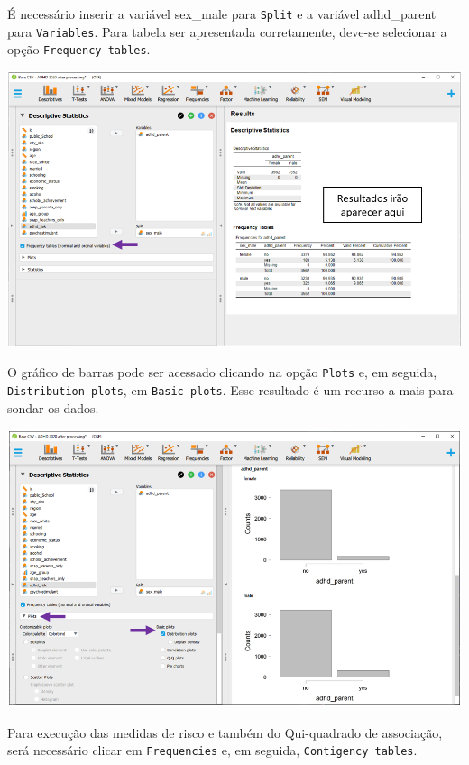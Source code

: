 \documentclass[
]{book}
\begin{document}
É necessário inserir a variável sex\_male para \texttt{Split} e a variável adhd\_parent para \texttt{Variables}. Para tabela ser apresentada corretamente, deve-se selecionar a opção \texttt{Frequency\ tables}.

\includegraphics{./img/cap_x2_descritivo.png}

O gráfico de barras pode ser acessado clicando na opção \texttt{Plots} e, em seguida, \texttt{Distribution\ plots}, em \texttt{Basic\ plots}. Esse resultado é um recurso a mais para sondar os dados.

\includegraphics{./img/cap_x2_grafico.png}

Para execução das medidas de risco e também do Qui-quadrado de associação, será necessário clicar em \texttt{Frequencies} e, em seguida, \texttt{Contigency\ tables}.
\end{document}
